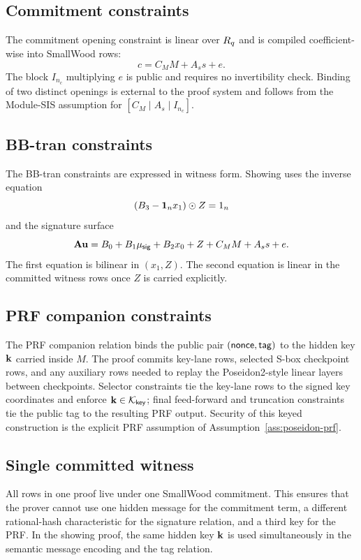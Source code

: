 \subsection{Commitment constraints}
The commitment opening constraint is linear over \(R_q\) and is compiled coefficient-wise into SmallWood rows:
\[
  c=C_MM+A_s s+e.
\]
The block \(I_{n_c}\) multiplying \(e\) is public and requires no invertibility check.  Binding of two distinct
openings is external to the proof system and follows from the Module-SIS assumption for
\([C_M\mid A_s\mid I_{n_c}]\).

\subsection{BB-tran constraints}
The BB-tran constraints are expressed in witness form.  Showing uses the inverse equation
\[
  (B_3-\mathbf 1_nx_1)\odot Z=1_n
\]
and the signature surface
\[
  \mathbf{A}\mathbf{u}=B_0+B_1\mu_{\mathsf{sig}}+B_2x_0+Z+C_MM+A_s s+e.
\]
The first equation is bilinear in \((x_1,Z)\).  The second equation is linear in the committed witness rows once
\(Z\) is carried explicitly.

\subsection{PRF companion constraints}
The PRF companion relation binds the public pair \((\mathsf{nonce},\mathsf{tag})\) to the hidden key \(\mathbf{k}\) carried inside
\(M\).  The proof commits key-lane rows, selected S-box checkpoint rows, and any auxiliary rows needed to replay the
Poseidon2-style linear layers between checkpoints.  Selector constraints tie the key-lane rows to the signed key
coordinates and enforce \(\mathbf{k}\in\mathcal K_{\mathsf{key}}\); final feed-forward and truncation constraints tie the
public tag to the resulting PRF output.  Security of this keyed construction is the explicit PRF assumption of
Assumption~\ref{ass:poseidon-prf}.

\subsection{Single committed witness}
All rows in one proof live under one SmallWood commitment.  This ensures that the prover cannot use one hidden
message for the commitment term, a different rational-hash characteristic for the signature relation, and a third key
for the PRF.  In the showing proof, the same hidden key \(\mathbf{k}\) is used simultaneously in the semantic message
encoding and the tag relation.
